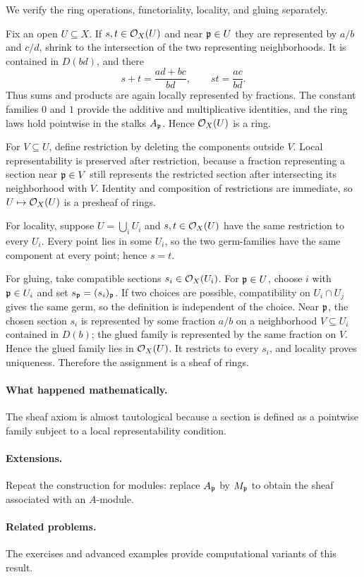 \begin{solution}
We verify the ring operations, functoriality, locality, and gluing separately.

Fix an open $U\subseteq X$.  If $s,t\in\mathcal O_X(U)$ and near $\mathfrak p\in U$ they are represented by $a/b$ and $c/d$, shrink to the intersection of the two representing neighborhoods.  It is contained in $D(bd)$, and there
\[
s+t=\frac{ad+bc}{bd},\qquad st=\frac{ac}{bd}.
\]
Thus sums and products are again locally represented by fractions.  The constant families $0$ and $1$ provide the additive and multiplicative identities, and the ring laws hold pointwise in the stalks $A_{\mathfrak p}$.  Hence $\mathcal O_X(U)$ is a ring.

For $V\subseteq U$, define restriction by deleting the components outside $V$.  Local representability is preserved after restriction, because a fraction representing a section near $\mathfrak p\in V$ still represents the restricted section after intersecting its neighborhood with $V$.  Identity and composition of restrictions are immediate, so $U\mapsto\mathcal O_X(U)$ is a presheaf of rings.

For locality, suppose $U=\bigcup_iU_i$ and $s,t\in\mathcal O_X(U)$ have the same restriction to every $U_i$.  Every point lies in some $U_i$, so the two germ-families have the same component at every point; hence $s=t$.

For gluing, take compatible sections $s_i\in\mathcal O_X(U_i)$.  For $\mathfrak p\in U$, choose $i$ with $\mathfrak p\in U_i$ and set $s_{\mathfrak p}=(s_i)_{\mathfrak p}$.  If two choices are possible, compatibility on $U_i\cap U_j$ gives the same germ, so the definition is independent of the choice.  Near $\mathfrak p$, the chosen section $s_i$ is represented by some fraction $a/b$ on a neighborhood $V\subseteq U_i$ contained in $D(b)$; the glued family is represented by the same fraction on $V$.  Hence the glued family lies in $\mathcal O_X(U)$.  It restricts to every $s_i$, and locality proves uniqueness.  Therefore the assignment is a sheaf of rings.
\end{solution}



\paragraph{What happened mathematically.}
The sheaf axiom is almost tautological because a section is defined as a pointwise family subject to a local representability condition.

\paragraph{Extensions.}
Repeat the construction for modules: replace $A_{\mathfrak p}$ by $M_{\mathfrak p}$ to obtain the sheaf associated with an $A$-module.

\paragraph{Related problems.}
The exercises and advanced examples provide computational variants of this result.
\fi

